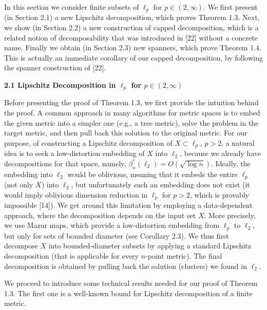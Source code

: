 \documentclass[10pt,a4paper]{amsart}
\begin{document}
In this section we consider finite subsets of $\ell_{p}$ for $p\in(2,\infty)$. We first present (in Section 2.1) a new Lipschitz decomposition, which proves Theorem 1.3. Next, we show (in Section 2.2) a new construction of capped decomposition, which is a related notion of decomposability that was introduced in [22] without a concrete name. Finally we obtain (in Section 2.3) new spanners, which prove Theorem 1.4. This is actually an immediate corollary of our capped decomposition, by following the spanner construction of [22].
\par
\par
\par\medskip\noindent\textbf{2.1 Lipschitz Decomposition in $\ell_{p}$ for $p\in(2,\infty)$}\par
Before presenting the proof of Theorem 1.3, we first provide the intuition behind the proof. A common approach in many algorithms for metric spaces is to embed the given metric into a simpler one (e.g., a tree metric), solve the problem in the target metric, and then pull back this solution to the original metric. For our purpose, of constructing a Lipschitz decomposition of $X\subset\ell_{p}$, $p>2$, a natural idea is to seek a low-distortion embedding of $X$ into $\ell_{2}$, because we already have decompositions for that space, namely, $\beta^{*}_{n}(\ell_{2})=O(\sqrt{\log{n}})$. Ideally, the embedding into $\ell_{2}$ would be oblivious, meaning that it embeds the entire $\ell_{p}$ (not only $X$) into $\ell_{2}$, but unfortunately such an embedding does not exist (it would imply oblivious dimension reduction in $\ell_{p}$ for $p>2$, which is provably impossible [14]). We get around this limitation by employing a data-dependent approach, where the decomposition depends on the input set $X$. More precisely, we use Mazur maps, which provide a low-distortion embedding from $\ell_{p}$ to $\ell_{2}$, but only for sets of bounded diameter (see Corollary 2.3). We thus first decompose $X$ into bounded-diameter subsets by applying a standard Lipschitz decomposition (that is applicable for every $n$-point metric). The final decomposition is obtained by pulling back the solution (clusters) we found in $\ell_{2}$.
\par
\par
We proceed to introduce some technical results needed for our proof of Theorem 1.3. The first one is a well-known bound for Lipschitz decomposition of a finite metric.
\par
\par
\end{document}
